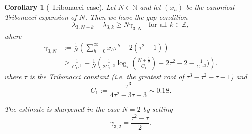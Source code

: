 \documentclass{amsart}
\newtheorem{corollary}[theorem]{Corollary}
\newcommand{\NN}{\mathbb N}
\newcommand{\ZZ}{\mathbb Z}
\begin{document}
\begin{corollary}[ Tribonacci case]\label{cor2}
Let $N\in \NN$ and let $(x_h)$ be the canonical Tribonacci expansion of $N$. Then we have the gap condition
\begin{equation}\label{gengaptr}
\lambda_{3,N+k}-\lambda_{3,k}\geq N\gamma_{3,N} \quad \text{for all } k\in \ZZ,
\end{equation}
where
\begin{align*}\gamma_{3,N}&:=\frac{1}{N}\left(\sum_{h=0}^\infty  x_h\tau^{h}-2(\tau^2-1)\right)\\&\geq \frac{1}{C_1\tau^3} -\frac{1}{N}\left({\frac{1}{2C_1\tau^3}\log_\tau \left( \frac{N +\frac{1}{2}}{C_1} \right)+2\tau^2-2-\frac{1}{C_1\tau^3})}\right).\end{align*}
where $\tau$ is the Tribonacci constant (i.e. the greatest root of $\tau^3-\tau^2-\tau-1$) and  $$C_1:= \frac{\tau^3}{4\tau^2 - 3\tau - 3}\sim 0.18. $$

The estimate is sharpened in the case $N=2$ by setting  $$\gamma_{3,2}=\frac{\tau^2-\tau}{2}.$$
\end{corollary}
\end{document}
